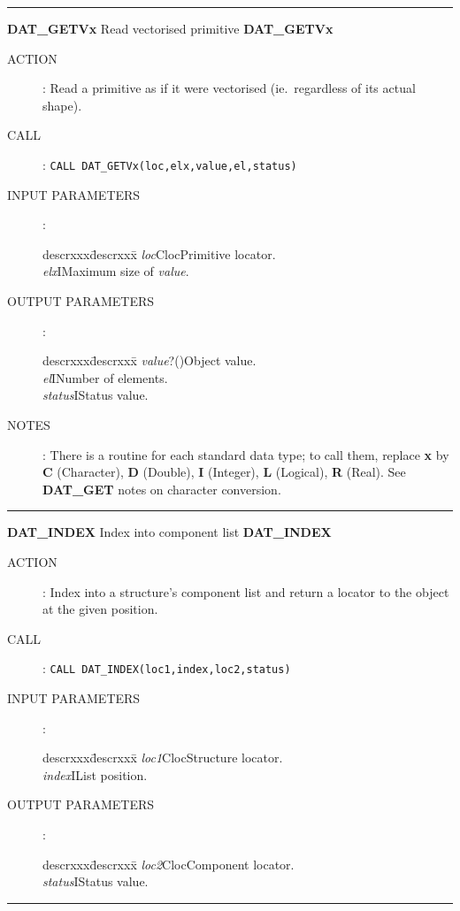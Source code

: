 \goodbreak
\rule{\textwidth}{0.3mm}
{\Large {\bf DAT\_GETVx} \hfill Read vectorised primitive \hfill {\bf DAT\_GETVx}}
\begin{description}
\item [ACTION]:
Read a primitive as if it were vectorised (ie.\ regardless of its actual shape).
\item [CALL]:
{\tt CALL DAT\_GETVx(loc,elx,value,el,status)}
\item [INPUT PARAMETERS]:
\begin{tabbing}
descrxxx\=descrxxx\=\kill
{\em loc}\>Cloc\>Primitive locator.\\
{\em elx}\>I\>Maximum size of {\em value}.
\end{tabbing}
\item [OUTPUT PARAMETERS]:
\begin{tabbing}
descrxxx\=descrxxx\=\kill
{\em value}\>?()\>Object value.\\
{\em el}\>I\>Number of elements.\\
{\em status}\>I\>Status value.
\end{tabbing}
\item [NOTES]:
There is a routine for each standard data type; to call them, replace {\bf x}
by {\bf C} (Character), {\bf D} (Double), {\bf I} (Integer), {\bf L} (Logical),
{\bf R} (Real).
See {\bf DAT\_GET} notes on character conversion.
\end{description}
\goodbreak
\rule{\textwidth}{0.3mm}
{\Large {\bf DAT\_INDEX} \hfill Index into component list \hfill {\bf DAT\_INDEX}}
\begin{description}
\item [ACTION]:
Index into a structure's component list and return a locator to the object
at the given position.
\item [CALL]:
{\tt CALL DAT\_INDEX(loc1,index,loc2,status)}
\item [INPUT PARAMETERS]:
\begin{tabbing}
descrxxx\=descrxxx\=\kill
{\em loc1}\>Cloc\>Structure locator.\\
{\em index}\>I\>List position.
\end{tabbing}
\item [OUTPUT PARAMETERS]:
\begin{tabbing}
descrxxx\=descrxxx\=\kill
{\em loc2}\>Cloc\>Component locator.\\
{\em status}\>I\>Status value.
\end{tabbing}
\end{description}
\goodbreak
\rule{\textwidth}{0.3mm}

